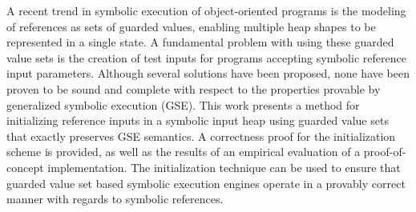 A recent trend in symbolic execution of object-oriented programs is the modeling of references as sets of guarded values, enabling multiple heap shapes to be represented in a single state. A fundamental problem with using these guarded value sets is the creation of test inputs for programs accepting symbolic reference input parameters. Although several solutions have been proposed, none have been proven to be sound and complete with respect to the properties provable by generalized symbolic execution (GSE). This work presents a method for initializing reference inputs in a symbolic input heap using guarded value sets that exactly preserves GSE semantics. A correctness proof for the initialization scheme is provided, as well as the results of an empirical evaluation of a proof-of-concept implementation. The initialization technique can be used to ensure that guarded value set based symbolic execution engines operate in a provably correct manner with regards to symbolic references.



